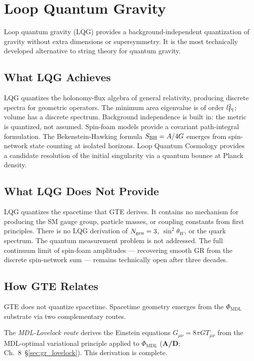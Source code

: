 \documentclass[11pt,openany]{book}
\theoremstyle{remark}
\newcommand{\PHIMDL}{\Phi_{\mathrm{MDL}}}
\newcommand{\Ngen}{N_{\rm gen}}
\newcommand{\sigW}{\sin^2\!\theta_W}
\newcommand{\CatAD}{\textbf{A/D}}
\begin{document}
\section{Loop Quantum Gravity}
\label{sec:lqg}

Loop quantum gravity (LQG) provides a background-independent quantization of gravity
without extra dimensions or supersymmetry.  It is the most technically developed
alternative to string theory for quantum gravity.

\subsection*{What LQG Achieves}

LQG quantizes the holonomy-flux algebra of general relativity, producing discrete spectra
for geometric operators.  The minimum area eigenvalue is of order $l_{\rm Pl}^2$;
volume has a discrete spectrum.  Background independence is built in: the metric is
quantized, not assumed.  Spin-foam models provide a covariant path-integral formulation.
The Bekenstein-Hawking formula $S_{\rm BH} = A/4G$ emerges from spin-network state
counting at isolated horizons.  Loop Quantum Cosmology provides a candidate resolution
of the initial singularity via a quantum bounce at Planck density.

\subsection*{What LQG Does Not Provide}

LQG quantizes the spacetime that GTE derives.  It contains no mechanism for producing
the SM gauge group, particle masses, or coupling constants from first principles.  There
is no LQG derivation of $\Ngen = 3$, $\sigW$, or the quark spectrum.  The quantum
measurement problem is not addressed.  The full continuum limit of spin-foam
amplitudes — recovering smooth GR from the discrete spin-network sum — remains
technically open after three decades.

\subsection*{How GTE Relates}

GTE does not quantize spacetime.  Spacetime geometry emerges from the $\PHIMDL$ substrate
via two complementary routes.

The \emph{MDL-Lovelock route} derives the Einstein equations $G_{\mu\nu} = 8\pi G
T_{\mu\nu}$ from the MDL-optimal variational principle applied to $\PHIMDL$ (\CatAD;
Ch.~8~§\ref{sec:gr_lovelock}).  This derivation is complete.
\end{document}
